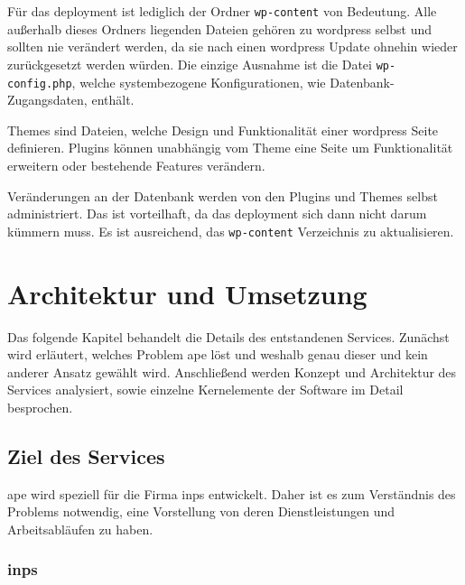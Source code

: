 Für das \gls{deployment} ist lediglich der Ordner \lstinline!wp-content! von Bedeutung. Alle außerhalb dieses Ordners liegenden Dateien gehören zu \gls{wordpress} selbst und sollten nie verändert werden, da sie nach einen \gls{wordpress} Update ohnehin wieder zurückgesetzt werden würden. Die einzige Ausnahme ist die Datei \lstinline!wp-config.php!, welche systembezogene Konfigurationen, wie Datenbank-Zugangsdaten, enthält.

Themes sind Dateien, welche Design und Funktionalität einer \gls{wordpress} Seite definieren. Plugins können unabhängig vom Theme eine Seite um Funktionalität erweitern oder bestehende Features verändern.

Veränderungen an der Datenbank werden von den Plugins und Themes selbst administriert. Das ist vorteilhaft, da das \gls{deployment} sich dann nicht darum kümmern muss. Es ist ausreichend, das \lstinline!wp-content! Verzeichnis zu aktualisieren.




\section{Architektur und Umsetzung} %
\label{sec:architektur_und_umsetzung}

Das folgende Kapitel behandelt die Details des entstandenen Services. Zunächst wird erläutert, welches Problem \gls{ape} löst und weshalb genau dieser und kein anderer Ansatz gewählt wird. Anschließend werden Konzept und Architektur des Services analysiert, sowie einzelne Kernelemente der Software im Detail besprochen.

\subsection{Ziel des Services} %
\label{sub:ziel_des_services}

\gls{ape} wird speziell für die Firma \gls{inps} entwickelt. Daher ist es zum Verständnis des Problems notwendig, eine Vorstellung von deren Dienstleistungen und Arbeitsabläufen zu haben.

\subsubsection{\gls{inps}} %
\label{ssub:inps}

